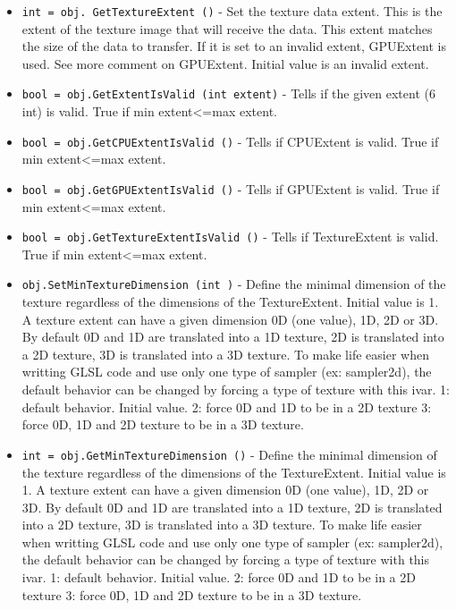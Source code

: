 \begin{itemize}
\item  \verb|int = obj. GetTextureExtent ()| -  Set the texture data extent. This is the extent of the texture image that
 will receive the data. This extent matches the size of the data to
 transfer. If it is set to an invalid extent, GPUExtent is used.
 See more comment on GPUExtent.
 Initial value is an invalid extent.

\item  \verb|bool = obj.GetExtentIsValid (int extent)| -  Tells if the given extent (6 int) is valid. True if min
 extent<=max extent.
 

\item  \verb|bool = obj.GetCPUExtentIsValid ()| -  Tells if CPUExtent is valid. True if min extent<=max extent.

\item  \verb|bool = obj.GetGPUExtentIsValid ()| -  Tells if GPUExtent is valid. True if min extent<=max extent.

\item  \verb|bool = obj.GetTextureExtentIsValid ()| -  Tells if TextureExtent is valid. True if min extent<=max extent.

\item  \verb|obj.SetMinTextureDimension (int )| -  Define the minimal dimension of the texture regardless of the dimensions
 of the TextureExtent. Initial value is 1.
 A texture extent can have a given dimension 0D (one value), 1D, 2D or 3D.
 By default 0D and 1D are translated into a 1D texture, 2D is translated
 into a 2D texture, 3D is translated into a 3D texture. To make life easier
 when writting GLSL code and use only one type of sampler (ex: sampler2d),
 the default behavior can be changed by forcing a type of texture with
 this ivar.
 1: default behavior. Initial value.
 2: force 0D and 1D to be in a 2D texture
 3: force 0D, 1D and 2D texture to be in a 3D texture.

\item  \verb|int = obj.GetMinTextureDimension ()| -  Define the minimal dimension of the texture regardless of the dimensions
 of the TextureExtent. Initial value is 1.
 A texture extent can have a given dimension 0D (one value), 1D, 2D or 3D.
 By default 0D and 1D are translated into a 1D texture, 2D is translated
 into a 2D texture, 3D is translated into a 3D texture. To make life easier
 when writting GLSL code and use only one type of sampler (ex: sampler2d),
 the default behavior can be changed by forcing a type of texture with
 this ivar.
 1: default behavior. Initial value.
 2: force 0D and 1D to be in a 2D texture
 3: force 0D, 1D and 2D texture to be in a 3D texture.


\end{itemize}
